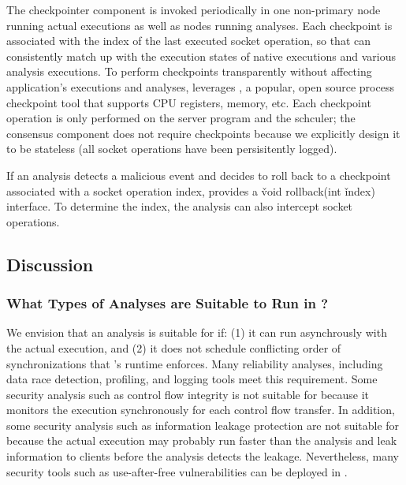 The checkpointer component is invoked periodically in one non-primary node 
running actual executions as well as nodes running analyses. Each 
checkpoint is associated with the index of the last executed socket operation, 
so that \xxx can consistently match up with the execution states of native 
executions and various analysis executions. To perform checkpoints 
transparently without affecting application's executions and analyses, \xxx 
leverages \criu, a popular, open source process checkpoint tool that supports 
CPU registers, memory, etc. Each checkpoint operation is only performed on the 
server program and the \dmt schculer; the \paxos consensus component does not 
require checkpoints because we explicitly design it to be stateless (all socket 
operations have been persisitently logged).

If an analysis detects a malicious event and decides to roll back to a 
checkpoint associated with a socket operation index, \xxx provides a 
\v{void rollback(int} \v{index)} interface. To determine the index, the 
analysis can also intercept socket operations.



\subsection{Discussion} \label{sec:discuss}

\subsubsection{What Types of Analyses are Suitable to Run in \xxx?} 
\label{sec:analysis-types}

We envision that an analysis is suitable for \xxx if: (1) it can run 
asynchrously with the actual execution, and (2) it does not schedule 
conflicting order of \pthread synchronizations that \xxx's \dmt runtime 
enforces. Many reliability analyses, including data race detection, profiling, 
and logging tools meet this requirement. Some security analysis such as control 
flow integrity is not suitable for \xxx because it monitors the execution 
synchronously for each control flow transfer. In addition, some security 
analysis such as information leakage protection are not suitable for \xxx 
because the actual execution may probably run faster than the 
analysis and leak information to clients before the analysis detects the 
leakage. Nevertheless, many security tools such as use-after-free 
vulnerabilities can be deployed in \xxx.

